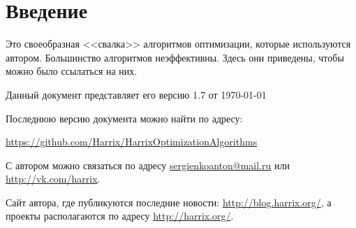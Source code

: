 \section{Введение}

Это своеобразная <<свалка>> алгоритмов оптимизации, которые используются автором. Большинство алгоритмов неэффективны. Здесь они приведены, чтобы можно было ссылаться на них.

Данный документ представляет его версию 1.7 от \today

Последнюю версию документа можно найти по адресу:

\href{https://github.com/Harrix/HarrixOptimizationAlgorithms}{https://github.com/Harrix/HarrixOptimizationAlgorithms}

С автором можно связаться по адресу \href{mailto:sergienkoanton@mail.ru}{sergienkoanton@mail.ru} или  \href{http://vk.com/harrix}{http://vk.com/harrix}.

Сайт автора, где публикуются последние новости: \href{http://blog.harrix.org/}{http://blog.harrix.org/}, а проекты располагаются по адресу \href{http://harrix.org/}{http://harrix.org/}.